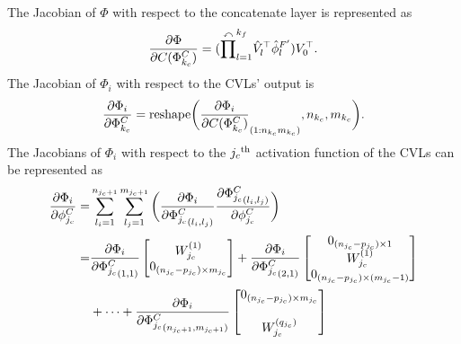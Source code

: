 \documentclass{l4dc2025}
\begin{document}
\begin{appendix}
The Jacobian of $\Phi$ with respect to the concatenate layer is represented as
\begin{equation}
    {\partial \Phi\over\partial C(\Phi^C_{k_c})} = 
    (\overset{\curvearrowleft}\prod^{k_f}_{l=1} 
    {\hat V}^\top  _l {\hat\phi}_l^{F'}  ) V_0^\top  .
    \label{eq. dPhi/dC}
\end{equation}
The Jacobian of $\Phi_i$ with respect to the CVLs' output is
\begin{equation}
    {\partial \Phi_i\over\partial \Phi^C_{k_c}} = 
    \text{reshape}
    \bigg(
    {\partial \Phi_i\over\partial  C(\Phi^C_{k_c})}
    _{(1:n_{k_c}m_{k_c})}
    ,n_{k_c},m_{k_c}
    \bigg).
    \label{eq, dC/dPhi to dPhidPhi}    
\end{equation}
The Jacobians of $\Phi_i$ with respect to the $j_c\textsuperscript{th}$ activation function of the CVLs can be represented as
\begin{equation}
    \begin{aligned}
        {\partial \Phi_i\over\partial \phi^{C}_{j_c}} =&
        \sum_{l_i=1}^{n_{j_c+1}} \sum_{l_j=1}^{m_{j_c+1}} 
        \bigg(
            { \partial \Phi_i\over\partial {\Phi^C_{j_c}}_{(l_i,l_j)} }
            {\partial {\Phi^C_{j_c}}_{(l_i,l_j)}\over\partial \phi^{C}_{j_c}}
        \bigg)
        \\=&
        {\partial\Phi_i\over\partial {\Phi^C_{j_c}}_{(1,1)}}
        \begin{bmatrix}
            W_{{j_c}}^{(1)}\\ 0_{{(n_{{j_c}}}-p_{{j_c}})\times m_{{j_c}}}
        \end{bmatrix}
        +
        {\partial\Phi_i\over\partial {\Phi^C_{j_c}}_{(2,1)}}
        \begin{bmatrix}
            0_{(n_{{j_c}}-p_{{j_c}})\times 1}\\ 
            W_{{j_c}}^{(1)}\\
            0_{({n_{{j_c}}}-p_{{j_c}})\times (m_{{j_c}}-1)}
        \end{bmatrix}
        \\
        &+\cdots
        +{\partial\Phi_i\over\partial {\Phi^C_{j_c}}_{(n_{j_c+1}, m_{j_c+1})}}
        \begin{bmatrix}
            0_{{(n_{{j_c}}}-p_{{j_c}})\times m_{{j_c}}}\\ \\ 
            W_{{j_c}}^{(q_{j_c})}
        \end{bmatrix}

\end{aligned}
\end{equation}
\end{appendix}
\end{document}
